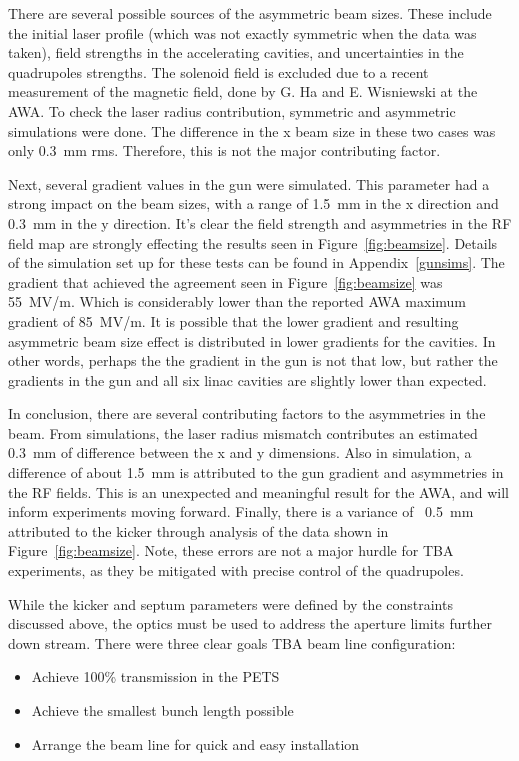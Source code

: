 There are several possible sources of the asymmetric beam sizes. 
These include the initial laser profile (which was not exactly symmetric
when the data was taken), field strengths in the accelerating cavities, 
and uncertainties in the quadrupoles strengths.
The solenoid field is excluded due to a recent measurement of the magnetic field, 
done by G. Ha and E. Wisniewski at the AWA. 
To check the laser radius contribution, symmetric and asymmetric simulations were done.
The difference in the x beam size in these two cases was only \SI{0.3}{mm} rms. 
Therefore, this is not the major contributing factor.

Next, several gradient values in the gun were simulated. 
This parameter had a strong impact on the beam sizes, with a range of \SI{1.5}{mm} 
in the x direction and \SI{0.3}{mm} in the y direction.
It's clear the field strength and asymmetries in the RF field map 
are strongly effecting the results seen in Figure~\ref{fig:beamsize}.
Details of the simulation set up for these tests can be found in Appendix~\ref{gunsims}.
The gradient that achieved the agreement seen in Figure~\ref{fig:beamsize} was \SI{55}{MV/m}.
Which is considerably lower than the reported AWA maximum gradient of \SI{85}{MV/m}.
It is possible that the lower gradient and resulting asymmetric beam size effect is 
distributed in lower gradients for the cavities. 
In other words, perhaps the the gradient in the gun is not that low, but rather
the gradients in the gun and all six linac cavities are slightly lower than expected.

In conclusion, there are several contributing factors to the asymmetries in the beam.
From simulations, the laser radius mismatch contributes an estimated \SI{0.3}{mm} of difference 
between the x and y dimensions. Also in simulation, a difference of about \SI{1.5}{mm} 
is attributed to the gun gradient and asymmetries in the RF fields. 
This is an unexpected and meaningful result for the AWA, and will inform experiments moving forward.
Finally, there is a variance of ~\SI{0.5}{mm} attributed to the kicker through analysis of the 
data shown in Figure~\ref{fig:beamsize}.
Note, these errors are not a major hurdle for TBA experiments, as they 
be mitigated with precise control of the quadrupoles.



While  the kicker and septum parameters were defined by the constraints discussed above, 
the optics must be used to address the aperture limits further down stream.
There were three clear goals TBA beam line configuration: 
\begin{itemize}
	\item Achieve 100\% transmission in the PETS
	\item Achieve the smallest bunch length possible
	\item Arrange the beam line for quick and easy installation
\end{itemize}

